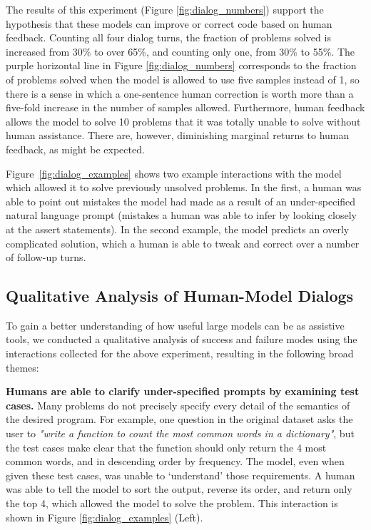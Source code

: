The results of this experiment (Figure \ref{fig:dialog_numbers}) support the hypothesis that these models can improve or correct code based on human feedback. Counting all four dialog turns, the fraction of problems solved is increased from 30\% to over 65\%, and counting only one, from 30\% to 55\%.
The purple horizontal line in Figure \ref{fig:dialog_numbers} corresponds to the fraction of problems solved when the model is allowed to use five samples instead of 1, so there is a sense in which a one-sentence human correction is worth more than a five-fold increase in the number of samples allowed. Furthermore, human feedback allows the model to solve 10 problems that it was totally unable to solve without human assistance. There are, however, diminishing marginal returns to human feedback, as might be expected.

Figure~\ref{fig:dialog_examples} shows two example interactions with the model which allowed it to solve previously unsolved problems. In the first, a human was able to point out mistakes the model had made as a result of an under-specified natural language prompt (mistakes a human was able to infer by looking closely at the assert statements). In the second example, the model predicts an overly complicated solution, which a human is able to tweak and correct over a number of follow-up turns. 

\subsection{Qualitative Analysis of Human-Model Dialogs}

To gain a better understanding of how useful large models can be as assistive tools, we conducted a qualitative analysis of success and failure modes using the interactions collected for the above experiment, resulting in the following broad themes:

\textbf{Humans are able to clarify under-specified prompts by examining test cases.} Many problems do not precisely specify every detail of the semantics of the desired program. For example, one question in the original dataset asks the user to \textit{"write a function to count the most common words in a dictionary"}, but the test cases make clear that the function should only return the 4 most common words, and in descending order by frequency. The model, even when given these test cases, was unable to `understand' those requirements. A human was able to tell the model to sort the output, reverse its order, and return only the top 4, which allowed the model to solve the problem. This interaction is shown in Figure \ref{fig:dialog_examples} (Left).

